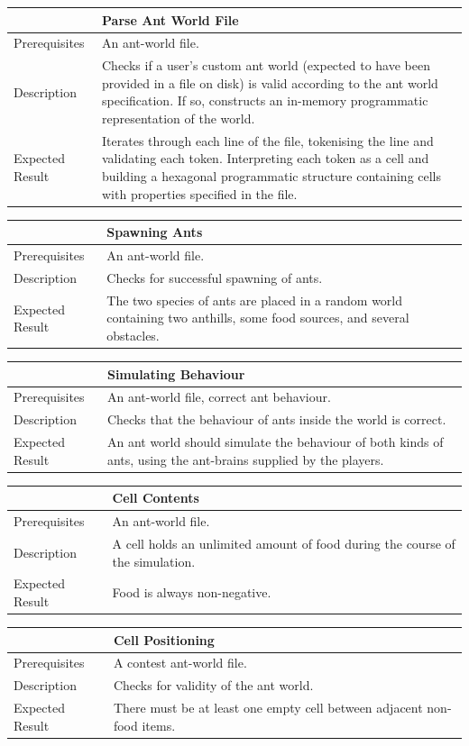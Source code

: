 \documentclass[11pt]{article}
\begin{document}
\begin{longtable}[c]{@{}p{}p{}@{}}
\toprule
& Parse Ant World File \tabularnewline
\midrule
Prerequisites & An ant-world file. \tabularnewline
Description & Checks if a user's custom ant world (expected to have
been provided in a file on disk) is valid according to the ant world
specification. If so, constructs an in-memory programmatic
representation of the world. \tabularnewline
Expected Result & Iterates through each line of the file, tokenising the
line and validating each token. Interpreting each token as a cell and
building a hexagonal programmatic structure containing cells with
properties specified in the file.\tabularnewline
\bottomrule
\end{longtable}

\begin{longtable}[c]{@{}p{}p{}@{}}
\toprule
& Spawning Ants \tabularnewline
\midrule
Prerequisites & An ant-world file. \tabularnewline
Description & Checks for successful spawning of ants. \tabularnewline
Expected Result & The two species of ants are placed in a random world
containing two anthills, some food sources, and several obstacles.\tabularnewline
\bottomrule
\end{longtable}

\begin{longtable}[c]{@{}p{}p{}@{}}
\toprule
& Simulating Behaviour \tabularnewline
\midrule
Prerequisites & An ant-world file, correct ant behaviour. \tabularnewline
Description & Checks that the behaviour of ants inside the world is correct. \tabularnewline
Expected Result & An ant world should simulate the behaviour of both
kinds of ants, using the ant-brains supplied by the players.\tabularnewline
\bottomrule
\end{longtable}

\begin{longtable}[c]{@{}p{}p{}@{}}
\toprule
& Cell Contents \tabularnewline
\midrule
Prerequisites & An ant-world file.\tabularnewline
Description & A cell holds an unlimited amount of food during the
course of the simulation. \tabularnewline
Expected Result & Food is always non-negative. \tabularnewline
\bottomrule
\end{longtable}

\begin{longtable}[c]{@{}p{}p{}@{}}
\toprule
& Cell Positioning \tabularnewline
\midrule
Prerequisites & A contest ant-world file.\tabularnewline
Description & Checks for validity of the ant world. \tabularnewline
Expected Result & There must be at least one empty cell between adjacent
non-food items. \tabularnewline
\bottomrule
\end{longtable}
\end{document}
